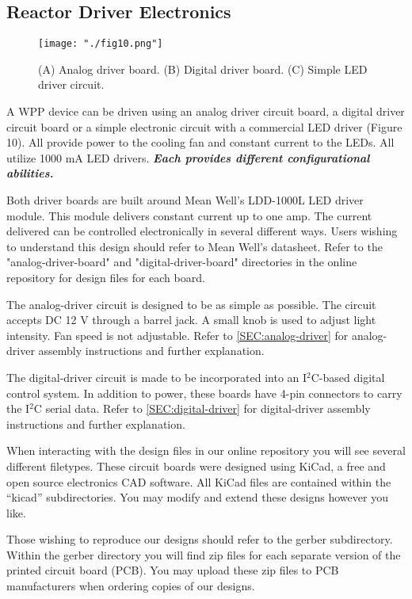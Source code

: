 \documentclass[11pt]{article}
\begin{document}
\clearpage

\subsection{Reactor Driver Electronics} \label{SEC:electronics}

\begin{figure}[H]
	\centering
	\texttt{[image: "./fig10.png"]}
	\caption{(A) Analog driver board. (B) Digital driver board. (C) Simple LED driver circuit.}
\end{figure}

A WPP device can be driven using an analog driver circuit board, a digital driver circuit board or a simple electronic circuit with a commercial LED driver (Figure 10).
All provide power to the cooling fan and constant current to the LEDs.
All utilize 1000 mA LED drivers. \textbf{\textit{Each provides different configurational abilities.}}

Both driver boards are built around Mean Well's LDD-1000L LED driver module.
This module delivers constant current up to one amp.
The current delivered can be controlled electronically in several different ways.
Users wishing to understand this design should refer to Mean Well's datasheet.
Refer to the "analog-driver-board" and "digital-driver-board" directories in the online repository for design files for each board.

The analog-driver circuit is designed to be as simple as possible.
The circuit accepts DC 12 V through a barrel jack.
A small knob is used to adjust light intensity.
Fan speed is not adjustable.
Refer to \autoref{SEC:analog-driver} for analog-driver assembly instructions and further explanation.

The digital-driver circuit is made to be incorporated into an I$^2$C-based digital control system.
In addition to power, these boards have 4-pin connectors to carry the I$^2$C serial data.
Refer to \autoref{SEC:digital-driver} for digital-driver assembly instructions and further explanation.

When interacting with the design files in our online repository you will see several different filetypes.
These circuit boards were designed using KiCad, a free and open source electronics CAD software.
All KiCad files are contained within the ``kicad'' subdirectories.
You may modify and extend these designs however you like.

Those wishing to reproduce our designs should refer to the gerber subdirectory.
Within the gerber directory you will find zip files for each separate version of the printed circuit board (PCB).
You may upload these zip files to PCB manufacturers when ordering copies of our designs.
\end{document}
